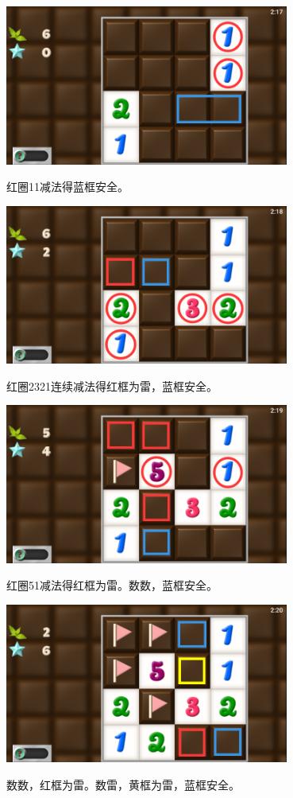 \subsection{} %
\begin{center}
    \includegraphics[width=0.7\textwidth]{puzzle/29-1.png}
\end{center}
红圈11减法得蓝框安全。
\begin{center}
    \includegraphics[width=0.7\textwidth]{puzzle/29-2.png}
\end{center}
红圈2321连续减法得红框为雷，蓝框安全。
\begin{center}
    \includegraphics[width=0.7\textwidth]{puzzle/29-3.png}
\end{center}
红圈51减法得红框为雷。数数，蓝框安全。
\begin{center}
    \includegraphics[width=0.7\textwidth]{puzzle/29-4.png}
\end{center}
数数，红框为雷。数雷，黄框为雷，蓝框安全。

